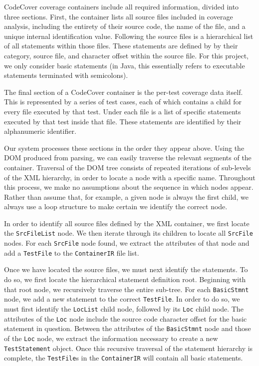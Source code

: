 CodeCover coverage containers include all required
information, divided into three sections.  First, the container lists all source
files included in coverage analysis, including the entirety of their source code,
the name of the file, and a unique internal identification value.  Following the source files
is a hierarchical list of all statements within those files.  These statements are defined by 
by their category, source file, and character offset within the source file.  For this
project, we only consider basic statements (in Java, this essentially refers to executable
statements terminated with semicolons).  

The final section of a CodeCover container is the per-test coverage data itself.  This is
represented by a series of test cases, each of which contains a child for every file
executed by that test. Under each file is a list of specific statements executed by that
test inside that file.  These statements are identified by their alphanumeric identifier.

Our system processes these sections in the order they appear above.  Using the DOM produced
from parsing, we can easily traverse the relevant segments of the container.  Traversal of
the DOM tree consists of repeated iterations of sub-levels of the XML hierarchy, in order
to locate a node with a specific name.  Throughout this process, we make no assumptions about
the sequence in which nodes appear.  Rather than assume that, for example, a given node is
always the first child, we always use a loop structure to make certain we identify the correct
node.

In order to identify all source files defined by the
XML container, we first locate the \texttt{SrcFileList} node.  We then iterate through its
children to locate all \texttt{SrcFile} nodes.  For each \texttt{SrcFile} node found, we 
extract the attributes of that node and add a \texttt{TestFile} to the \texttt{ContainerIR}
file list.  

Once we have located the source files, we must next identify the statements.  To do so, we first
locate the hierarchical statement definition root.  Beginning with that root node, we recursively
traverse the entire sub-tree.  For each \texttt{BasicStmnt} node, we add a new statement to the 
correct \texttt{TestFile}.  In order to do so, we must first identify the \texttt{LocList} child
node, followed by its \texttt{Loc} child node.  The attributes of the \texttt{Loc} node include
the source code character offset for the basic statement in question.  Between the attributes of
the \texttt{BasicStmnt} node and those of the \texttt{Loc} node, we extract the information
necessary to create a new \texttt{TestStatement} object.  Once this recursive traversal of the
statement hierarchy is complete, the \texttt{TestFile}s in the \texttt{ContainerIR} will contain
all basic statements.

